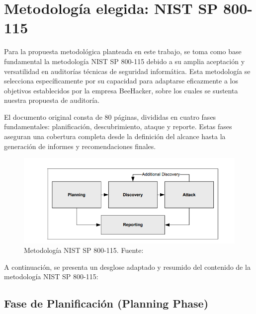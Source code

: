 \documentclass[a4paper, 10pt]{article}
\begin{document}
\clearpage







\section{Metodología elegida: NIST SP 800-115}


Para la propuesta metodológica planteada en este trabajo, se toma como base fundamental la metodología NIST SP 800-115 debido a su amplia aceptación y versatilidad en auditorías técnicas de seguridad informática. Esta metodología se selecciona específicamente por su capacidad para adaptarse eficazmente a los objetivos establecidos por la empresa BeeHacker, sobre los cuales se sustenta nuestra propuesta de auditoría. 
\par\vspace{0.5cm}


El documento original consta de 80 páginas, divididas en cuatro fases fundamentales: planificación, descubrimiento, ataque y reporte. Estas fases aseguran una cobertura completa desde la definición del alcance hasta la generación de informes y recomendaciones finales. \cite{nist800115} 


\begin{figure}[H]
    \centering
    \includegraphics[width=13cm]{images/nist_800115.png}
    \caption{Metodología NIST SP 800-115. Fuente: \cite{nist800115}}
    \label{fig:nist_800115}
\end{figure}

A continuación, se presenta un desglose adaptado y resumido del contenido de la metodología NIST SP 800-115:


\subsection{Fase de Planificación (Planning Phase)}
\end{document}

